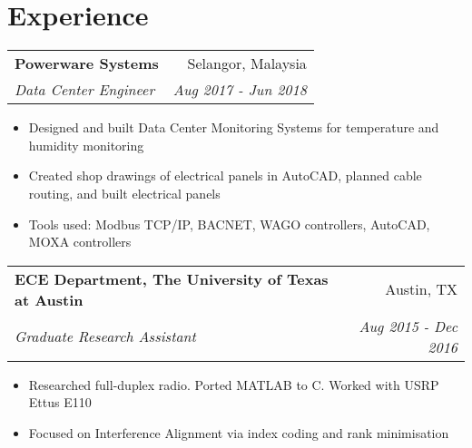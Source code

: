 \documentclass[letterpaper,11pt]{article}
\makeatletter
\newcommand{\JobSubheading}[4]{
  \vspace{-1pt}
    \begin{tabular*}{0.97\textwidth}[t]{l@{\extracolsep{\fill}}r}
      \textbf{#1} & #2  \\
      \textit{\small#3} & \textit{\small #4} \\
    \end{tabular*}\vspace{-5pt}
}
\makeatother
\begin{document}
\section{\color{BlueViolet} Experience}
    \vspace{-2pt}
    \JobSubheading
      {Powerware Systems}{Selangor, Malaysia}
      {Data Center Engineer}{Aug 2017 - Jun 2018}
      \vspace{0pt}
        \begin{itemize}
            \item Designed and built Data Center Monitoring Systems for temperature and humidity monitoring
            \vspace{-5pt}
            \item Created shop drawings of electrical panels in AutoCAD, planned cable routing, and built electrical panels
            \vspace{-5pt}
            \item Tools used: Modbus TCP/IP, BACNET, WAGO controllers, AutoCAD, MOXA controllers
        \end{itemize}
    \vspace{-2pt}

    \JobSubheading
      {ECE Department, The University of Texas at Austin}{Austin, TX}
      {Graduate Research Assistant}{Aug 2015 - Dec 2016}
      \vspace{0pt}
      \begin{itemize}
        \item Researched full-duplex radio. Ported MATLAB to C. Worked with USRP Ettus E110
        \vspace{-5pt}
        \item Focused on Interference Alignment via index coding and rank minimisation
      \end{itemize}
    \vspace{-2pt}
    
\end{document}
